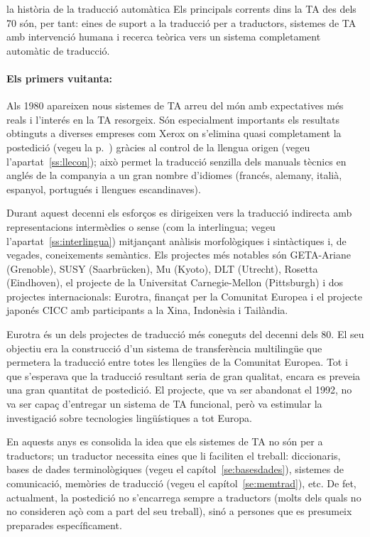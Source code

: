 \begin{persabermes}{la història de la traducció automàtica}
  Els principals corrents dins la TA des dels 70 són, per tant: eines
  de suport a la traducció per a traductors, sistemes de TA amb
  intervenció humana i recerca teòrica vers un sistema completament
  automàtic de traducció.

  \paragraph{Els primers vuitanta:} Als 1980 apareixen nous sistemes
  de TA arreu del món amb expectatives més reals i l'interés en la TA
  resorgeix.  Són especialment importants els resultats obtinguts a
  diverses empreses com Xerox on s'elimina quasi completament la
  postedició (vegeu la p.~\pageref{pg:homografia}) gràcies al control
  de la llengua origen (vegeu l'apartat~\ref{ss:llecon}); això permet
  la traducció senzilla dels manuals tècnics en anglés de la companyia
  a un gran nombre d'idiomes (francés, alemany, italià, espanyol,
  portugués i llengues escandinaves).

  Durant aquest decenni els esforços es dirigeixen vers la traducció
  indirecta amb representacions intermèdies o sense (com la
  interlingua; vegeu l'apartat~\ref{ss:interlingua}) mitjançant
  anàlisis morfològiques i sintàctiques i, de vegades, coneixements
  semàntics.  Els projectes més notables són GETA-Ariane (Grenoble),
  SUSY (Saarbrücken), Mu (Kyoto), DLT (Utrecht), Rosetta (Eindhoven),
  el projecte de la Universitat Carnegie-Mellon (Pittsburgh) i dos
  projectes internacionals: Eurotra, finançat per la Comunitat Europea
  i el projecte japonés CICC amb participants a la Xina, Indonèsia i
  Tailàndia.

  Eurotra és un dels projectes de traducció més coneguts del decenni
  dels 80. El seu objectiu era la construcció d'un sistema de
  transferència multilingüe que permetera la traducció entre totes les
  llengües de la Comunitat Europea.  Tot i que s'esperava que la
  traducció resultant seria de gran qualitat, encara es preveia una
  gran quantitat de postedició. El projecte, que va ser abandonat el
  1992, no va ser capaç d'entregar un sistema de TA funcional, però va
  estimular la investigació sobre tecnologies lingüístiques a tot
  Europa.

  En aquests anys es consolida la idea que els sistemes de TA no són
  per a traductors; un traductor necessita eines que li faciliten el
  treball: diccionaris, bases de dades terminològiques (vegeu el
  capítol~\ref{se:basesdades}), sistemes de comunicació, memòries de
  traducció (vegeu el capítol~\ref{se:memtrad}), etc.  De fet,
  actualment, la postedició no s'encarrega sempre a traductors (molts
  dels quals no no consideren açò com a part del seu treball), sinó a
  persones que es presumeix preparades específicament.


\end{persabermes}

